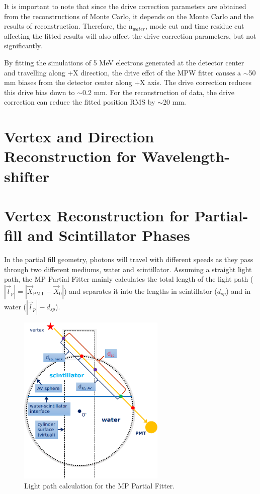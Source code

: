 It is important to note that since the drive correction parameters are obtained from the reconstructions of Monte Carlo, it depends on the Monte Carlo and the results of reconstruction. Therefore, the n$_{water}$, mode cut and time residue cut affecting the fitted results will also affect the drive correction parameters, but not significantly.

By fitting the simulations of 5 MeV electrons generated at the detector center and travelling along +X direction, the drive effct of the MPW fitter causes a $\sim$50 mm biases from the detector center along +X axis. The drive correction reduces this drive bias down to $\sim$0.2 mm. For the reconstruction of  data, the drive correction can reduce the fitted position RMS by $\sim$20 mm.


\section{Vertex and Direction Reconstruction for Wavelength-shifter}




\section{Vertex Reconstruction for Partial-fill and Scintillator Phases}

In the partial fill geometry, photons will travel with different speeds as they pass through two different mediums, water and scintillator. Assuming a straight light path, the MP Partial Fitter mainly calculates the total length of the light path ($|\vec{l}_p|=|\vec{X}_\mathrm{PMT}-\vec{X}_0|$) and separates it into the lengths in scintillator ($d_{sp}$) and in water ($|\vec{l}_p|-d_{sp}$).

\begin{figure}[!htb]
	\centering
	\includegraphics[width=7cm]{scintpath.png}
	\caption{Light path calculation for the MP Partial Fitter.}
	\label{scintpath}
\end{figure}

